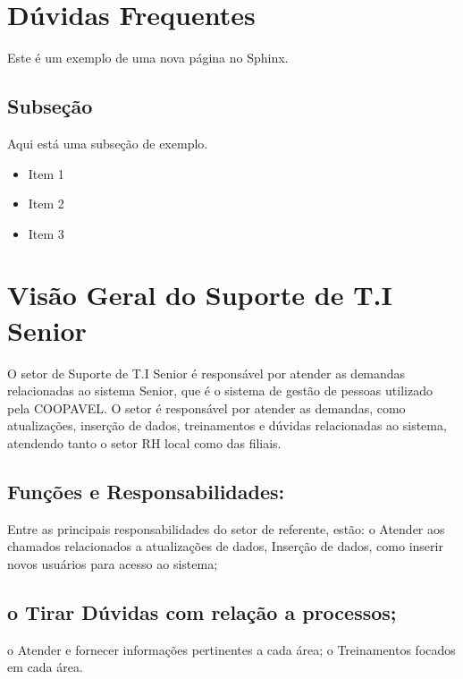\documentclass[letterpaper,10pt,brazil]{sphinxmanual}
\begin{document}
\sphinxstepscope


\section{Dúvidas Frequentes}
\label{\detokenize{duvidas:duvidas-frequentes}}\label{\detokenize{duvidas::doc}}
\sphinxAtStartPar
Este é um exemplo de uma nova página no Sphinx.


\subsection{Subseção}
\label{\detokenize{duvidas:subsecao}}
\sphinxAtStartPar
Aqui está uma subseção de exemplo.
\begin{itemize}
\item {} 
\sphinxAtStartPar
Item 1

\item {} 
\sphinxAtStartPar
Item 2

\item {} 
\sphinxAtStartPar
Item 3

\end{itemize}

\sphinxstepscope


\section{Visão Geral do Suporte de T.I Senior}
\label{\detokenize{visao_geral:visao-geral-do-suporte-de-t-i-senior}}\label{\detokenize{visao_geral::doc}}
\sphinxAtStartPar
O setor de Suporte de T.I Senior é responsável por atender as demandas
relacionadas ao sistema Senior, que é o sistema de gestão de pessoas
utilizado pela COOPAVEL. O setor é responsável por atender as demandas, como atualizações, inserção de dados, treinamentos
e dúvidas relacionadas ao sistema, atendendo tanto o setor RH local como das filiais.


\subsection{Funções e Responsabilidades:}
\label{\detokenize{visao_geral:funcoes-e-responsabilidades}}
\sphinxAtStartPar
Entre as principais responsabilidades do setor de referente, estão:
o Atender aos chamados relacionados a atualizações de dados,
Inserção de dados, como inserir novos usuários para acesso ao
sistema;


\subsection{o Tirar Dúvidas com relação a processos;}
\label{\detokenize{visao_geral:o-tirar-duvidas-com-relacao-a-processos}}
\sphinxAtStartPar
o Atender e fornecer informações pertinentes a cada área;
o Treinamentos focados em cada área.
\end{document}
